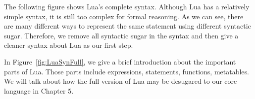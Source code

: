 The following figure shows Lua's complete syntax.
%
Although Lua has a relatively simple syntax, it is still too complex for formal reasoning.
As we can see, there are
many different ways to represent the same statement using different syntactic sugar. Therefore, we remove all syntactic sugar in the syntax and then give a cleaner syntax about Lua as our first step.

In Figure~\ref{fig:LuaSynFull}, we give a brief introduction about the important parts of Lua. Those parts include expressions, statements, functions, metatables. We will talk about how the full version of Lua may be desugared to our core language in Chapter 5.


\newcommand{\syntax}[2]{{\tt #1}{\tt ~::=}{\tt ~~#2}\\}

\newcommand{\syntaxcase}[1]{{\tt \quad\quad\quad\quad\quad\quad~}{\tt ~~#1}\\}

